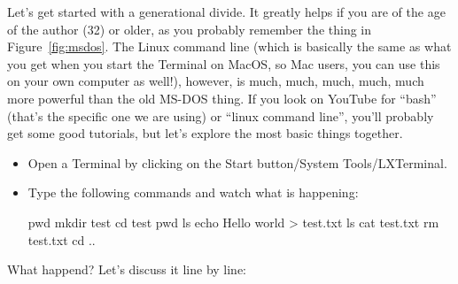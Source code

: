 \documentclass[a4paper,12pt]{book}
\renewcommand{\texttt}[1]{%
  \begingroup
  \ttfamily
  \begingroup\lccode`~=`/\lowercase{\endgroup\def~}{/\discretionary{}{}{}}%
  \begingroup\lccode`~=`[\lowercase{\endgroup\def~}{[\discretionary{}{}{}}%
  \begingroup\lccode`~=`.\lowercase{\endgroup\def~}{.\discretionary{}{}{}}%
  \begingroup\lccode`~=`(\lowercase{\endgroup\def~}{(\discretionary{}{}{}}%
  \catcode`/=\active\catcode`[=\active\catcode`.=\active\catcode`(=\active
  \scantokens{#1\noexpand}%
  \endgroup
}
\begin{document}
 Let’s get started with a generational divide. It greatly helps if you are of the age of the author (32) or older, as you probably remember the thing in Figure~\ref{fig:msdos}. The Linux command line (which is basically the same as what you get when you start the Terminal on MacOS, so Mac users, you can use this on your own computer as well!), however, is much, much, much, much, much more powerful than the old MS-DOS thing. If you look on YouTube for ``bash'' (that's the specific one we are using) or ``linux command line'', you'll probably get some good tutorials, but let's explore the most basic things together.
 \begin{itemize}
 \item Open a Terminal by clicking on the Start button/System Tools/LXTerminal.
 \item Type the following commands and watch what is happening: \begin{lstlistingbash}
pwd
mkdir test
cd test
pwd
ls
echo Hello world > test.txt
ls
cat test.txt
rm test.txt
cd ..
 \end{lstlistingbash}
\end{itemize}
What happend? Let's discuss it line by line:
 
\end{document}
